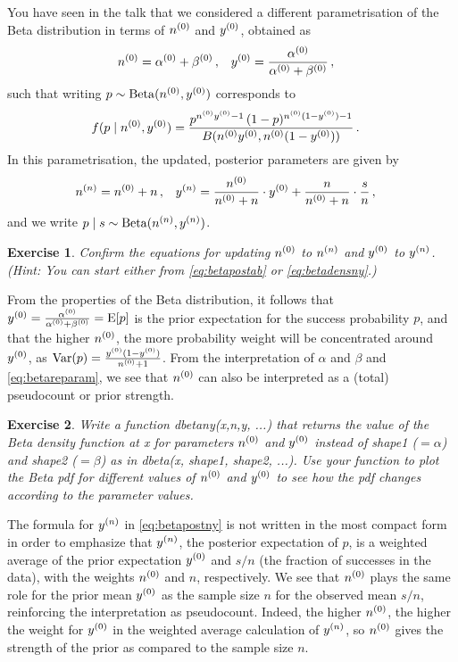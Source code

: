 \documentclass[12pt,a4paper	,twoside]{article}
\newcommand{\E}{\operatorname{E}}
\newcommand{\V}{\operatorname{Var}}
\newcommand{\be}{\operatorname{Beta}}
\newcommand{\code}[1]{\emph{\ttfamily #1}}
\newtheorem{myex}{Exercise}
\begin{document}
You have seen in the talk that we considered a different parametrisation of the Beta distribution
in terms of $n^{(0)}$ and $y^{(0)}$, obtained as
\begin{align}
n^{(0)} &= \alpha^{(0)} + \beta^{(0)}\,, & y^{(0)} &= \frac{\alpha^{(0)}}{\alpha^{(0)}+\beta^{(0)}}\,,
\label{eq:betareparam}
\end{align}
such that writing $p \sim \be(\nz,\yz)$ corresponds to
\begin{align}
f(p\mid n^{(0)},y^{(0)}) &= \frac{p^{n^{(0)}y^{(0)}-1}\, (1-p)^{n^{(0)}(1-y^{(0)})-1}}{B(n^{(0)}y^{(0)},n^{(0)}(1-y^{(0)}))}\,.
\label{eq:betadensny}
\end{align}
In this parametrisation, the updated, posterior parameters are given by
\begin{align}
n^{(n)} &= n^{(0)} + n\,, &
y^{(n)} &= \frac{n^{(0)}}{n^{(0)} + n} \cdot y^{(0)} + \frac{n}{n^{(0)} + n} \cdot \frac{s}{n}\,,
\label{eq:betapostny}
\end{align}
and we write $p\mid s \sim \be(\nn,\yn)$.

\begin{myex}
Confirm the equations for updating $n^{(0)}$ to $n^{(n)}$ and $y^{(0)}$ to $y^{(n)}$.
(Hint: You can start either from \eqref{eq:betapostab} or \eqref{eq:betadensny}.)
\end{myex}

From the properties of the Beta distribution,
it follows that $\yz = \frac{\az}{\az+\bz} = \E[p]$
is the prior expectation for the success probability $p$,
and that the higher $n^{(0)}$, the more probability weight will be concentrated around $y^{(0)}$,
as $\V(p) = \frac{\yz (1-\yz)}{\nz + 1}$.
From the interpretation of $\alpha$ and $\beta$ and \eqref{eq:betareparam},
we see that $n^{(0)}$ can also be interpreted as a (total) pseudocount or prior strength.

\begin{myex}
Write a function \code{dbetany(x,n,y, ...)}
that returns the value of the Beta density function at \code{x}
for parameters $n^{(0)}$ and $y^{(0)}$ instead of \code{shape1} ($=\alpha$) and \code{shape2} ($=\beta$)
as in \code{dbeta(x, shape1, shape2, ...)}.
Use your function to plot the Beta pdf for different values of $n^{(0)}$ and $y^{(0)}$
to see how the pdf changes according to the parameter values.
\end{myex}

The formula for $y^{(n)}$ in \eqref{eq:betapostny} is not written in the most compact form
in order to emphasize that $y^{(n)}$, the posterior expectation of $p$,
is a weighted average of the prior expectation $y^{(0)}$ and $s/n$ (the fraction of successes in the data),
with the weights $n^{(0)}$ and $n$, respectively.
We see that $n^{(0)}$ plays the same role for the prior mean $y^{(0)}$
as the sample size $n$ for the observed mean $s/n$,
reinforcing the interpretation as pseudocount.
Indeed, the higher $n^{(0)}$, the higher the weight for $y^{(0)}$
in the weighted average calculation of $y^{(n)}$,
so $n^{(0)}$ gives the strength of the prior as compared to the sample size $n$.
\end{document}
